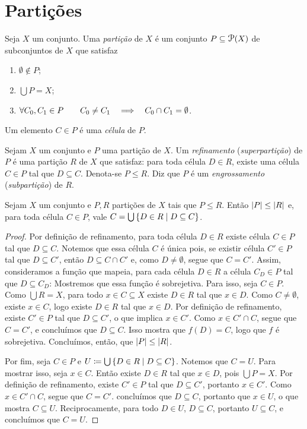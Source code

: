 \section{Partições}

\begin{defi}
Seja $X$ um conjunto. Uma \emph{partição} de $X$ é um conjunto $P \subseteq \p(X)$ de subconjuntos de $X$ que satisfaz
	\begin{enumerate}
	\item $\emptyset \notin P$;
	\item $\displaystyle\bigcup P = X$;
	\item $\forall C_0,C_1 \in P \qquad C_0 \neq C_1 \quad \Longrightarrow \quad C_0 \cap C_1 = \emptyset$.
	\end{enumerate}
Um elemento $C \in P$ é uma \emph{célula} de $P$.
\end{defi}

\begin{defi}
Sejam $X$ um conjunto e $P$ uma partição de $X$. Um \emph{refinamento} (\emph{superpartição}) de $P$ é uma partição $R$ de $X$ que satisfaz: para toda célula $D \in R$, existe uma célula $C \in P$ tal que $D \subseteq C$. Denota-se $P \leq R$. Diz que $P$ é um \emph{engrossamento} (\emph{subpartição}) de $R$.
\end{defi}

\begin{prop}
Sejam $X$ um conjunto e $P,R$ partições de $X$ tais que $P \leq R$. Então $\left\vert{P}\right\vert \leq \left\vert{R}\right\vert$ e, para toda célula $C \in P$, vale $C=\bigcup \left\{D \in R \;\middle\vert\; D \subseteq C \right\}$.
\end{prop}
\begin{proof}
Por definição de refinamento, para toda célula $D \in R$ existe célula $C \in P$ tal que $D \subseteq C$. Notemos que essa célula $C$ é única pois, se existir célula $C' \in P$ tal que $D \subseteq C'$, então $D \subseteq C \cap C'$ e, como $D \neq \emptyset$, segue que $C =C'$. Assim, consideramos a função que mapeia, para cada célula $D \in R$ a célula $C_D \in P$ tal que $D \subseteq C_D$:  Mostremos que essa função é sobrejetiva. Para isso, seja $C \in P$. Como $\bigcup R = X$, para todo $x \in C \subseteq X$ existe $D \in R$ tal que $x \in D$. Como $C \neq \emptyset$, existe $x \in C$, logo existe $D \in R$ tal que $x \in D$. Por definição de refinamento, existe $C' \in P$ tal que $D \subseteq C'$, o que implica $x \in C'$. Como $x \in C' \cap C$, segue que $C=C'$, e concluímos que $D \subseteq C$. Isso mostra que $f(D)=C$, logo que $f$ é sobrejetiva. Concluímos, então, que $\left\vert{P}\right\vert \leq \left\vert{R}\right\vert$.

Por fim, seja $C \in P$ e $U \coloneqq \bigcup \set{D \in R}{D \subseteq C}$. Notemos que $C=U$. Para mostrar isso, seja $x \in C$. Então existe $D \in R$ tal que $x \in D$, pois $\bigcup P=X$. Por definição de refinamento, existe $C' \in P$ tal que $D \subseteq C'$, portanto $x \in C'$. Como $x \in C' \cap C$, segue que $C=C'$. concluímos que $D \subseteq C$, portanto que $x \in U$, o que mostra $C \subseteq U$. Reciprocamente, para todo $D \in U$, $D \subseteq C$, portanto $U \subseteq C$, e concluímos que $C=U$.
\end{proof}

